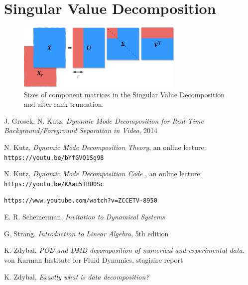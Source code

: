 \documentclass[10pt,twocolumn]{article}
\begin{document}
\section{Singular Value Decomposition} \label{app:C}


\begin{figure}[H]
\centering\includegraphics[width=8cm]{svd.png}
\caption{Sizes of component matrices in the Singular Value Decomposition and after rank truncation.}
\label{fig:linear_system}
\end{figure}


\thebibliography{}

 J. Grosek, N. Kutz, \textit{Dynamic Mode Decomposition for Real-Time Background/Foreground Separation in Video}, 2014

 N. Kutz, \textit{Dynamic Mode Decomposition Theory}, an online lecture: \verb|https://youtu.be/bYfGVQ1Sg98| \label{bib:kutz_1}

 N. Kutz, \textit{Dynamic Mode Decomposition Code }, an online lecture: \verb|https://youtu.be/KAau5TBU0Sc| \label{bib:kutz_2}

 \verb|https://www.youtube.com/watch?v=ZCCETV-8950| \label{bib:andymation}

 E. R. Scheinerman, \textit{Invitation to Dynamical Systems}

 G. Strang, \textit{Introduction to Linear Algebra}, 5th edition

 K. Zdybal, \textit{POD and DMD decomposition of numerical and experimental data}, von Karman Institute for Fluid Dynamics, stagiaire report 

 K. Zdybal, \textit{Exactly what is data decomposition?}
\end{document}
